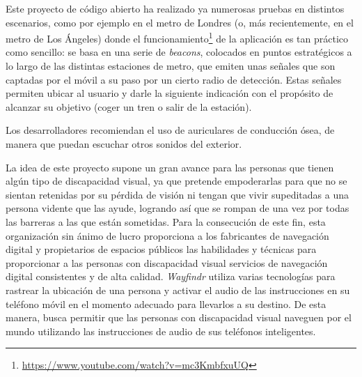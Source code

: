 Este proyecto de código abierto ha realizado ya numerosas pruebas en distintos escenarios, como por ejemplo en el metro de Londres (o, más recientemente, en el metro de Los Ángeles) donde el funcionamiento\footnote{\url{https://www.youtube.com/watch?v=mc3KmbfxuUQ}} de la aplicación es tan práctico como sencillo: se basa en una serie de \textit{beacons}, colocados en puntos estratégicos a lo largo de las distintas estaciones de metro, que emiten unas señales que son captadas por el móvil a su paso por un cierto radio de detección. Estas señales permiten ubicar al usuario y darle la siguiente indicación con el propósito de alcanzar su objetivo (coger un tren o salir de la estación). 

Los desarrolladores recomiendan el uso de auriculares de conducción ósea, de manera que puedan escuchar otros sonidos del exterior.

La idea de este proyecto supone un gran avance para las personas que tienen algún tipo de discapacidad visual, ya que pretende empoderarlas para que no se sientan retenidas por su pérdida de visión ni tengan que vivir supeditadas a una persona vidente que las ayude, logrando así que se rompan de una vez por todas las barreras a las que están sometidas. Para la consecución de este fin, esta organización sin ánimo de lucro proporciona a los fabricantes de navegación digital y propietarios de espacios públicos las habilidades y técnicas para proporcionar a las personas con discapacidad visual servicios de navegación digital consistentes y de alta calidad. \textit{Wayfindr} utiliza varias tecnologías para rastrear la ubicación de una persona y activar el audio de las instrucciones en su teléfono móvil en el momento adecuado para llevarlos a su destino. De esta manera, busca permitir que las personas con discapacidad visual naveguen por el mundo utilizando las instrucciones de audio de sus teléfonos inteligentes.

